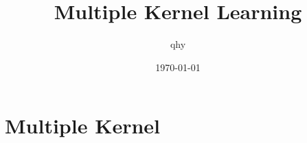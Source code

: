 \documentclass[UTF8,a4paper]{ctexart}
\author{qhy}
\date{\today}
\title{Multiple Kernel Learning}
\begin{document}
    \maketitle
    \tableofcontents
    \newpage
    \section{Multiple Kernel}
\end{document}
